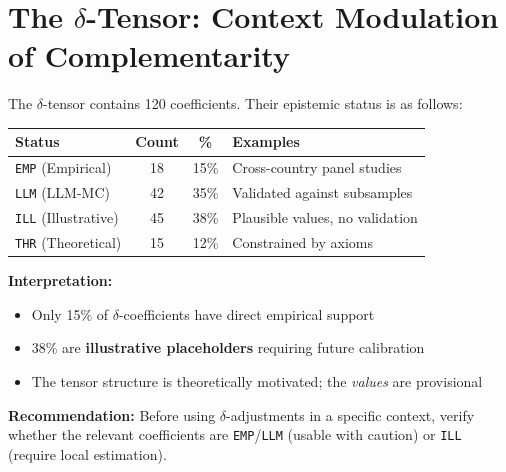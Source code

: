 \documentclass[11pt,a4paper]{article}
\theoremstyle{definition}
\begin{document}

\section{The $\delta$-Tensor: Context Modulation of Complementarity}



\begin{tcolorbox}[colback=orange!10!white, colframe=orange!75!black, 
    title=\textbf{⚠ Data Status of δ-Tensor Coefficients}]

The $\delta$-tensor contains 120 coefficients. Their epistemic status is as follows:

\begin{center}
\renewcommand{\arraystretch}{1.3}
\begin{tabular}{@{}lccp{5cm}@{}}
\toprule
\textbf{Status} & \textbf{Count} & \textbf{\%} & \textbf{Examples} \\
\midrule
\cellcolor{green!20}\texttt{EMP} (Empirical) & 18 & 15\% & Cross-country panel studies \\
\cellcolor{blue!20}\texttt{LLM} (LLM-MC) & 42 & 35\% & Validated against subsamples \\
\cellcolor{yellow!20}\texttt{ILL} (Illustrative) & 45 & 38\% & Plausible values, no validation \\
\cellcolor{gray!20}\texttt{THR} (Theoretical) & 15 & 12\% & Constrained by axioms \\
\bottomrule
\end{tabular}
\end{center}

\textbf{Interpretation:}
\begin{itemize}[nosep]
\item Only 15\% of $\delta$-coefficients have direct empirical support
\item 38\% are \textbf{illustrative placeholders} requiring future calibration
\item The tensor structure is theoretically motivated; the \textit{values} are provisional
\end{itemize}

\textbf{Recommendation:} Before using $\delta$-adjustments in a specific context, 
verify whether the relevant coefficients are \texttt{EMP}/\texttt{LLM} (usable with caution) 
or \texttt{ILL} (require local estimation).

\end{tcolorbox}
\end{document}
